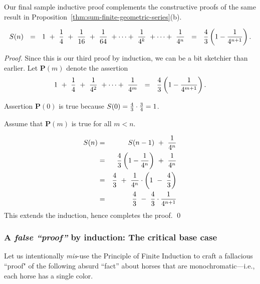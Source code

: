 Our final sample inductive proof complements the constructive proofs of the same result in 
Proposition~\ref{thm:sum-finite-geometric-series}(b).

\begin{prop}
\label{thm:sumof-1/4-induction}
\[
S(n) \ \ = \ \
1 \ + \ {1 \over 4} \ + \ {1 \over 16} \ + \ {1 \over 64} \ + \cdots + \ {1 \over 4^k } \ + \cdots + \ {1 \over 4^n }
\ \ = \ \  {4 \over 3} \left(1 - {1 \over 4^{n+1}} \right).
\]
\end{prop}

\begin{proof}
Since this is our third proof by induction, we can be a bit sketchier than earlier.  Let {\bf P}$(m)$ 
denote the assertion
\[ 1 \ + \ {1 \over 4} \ + \ {1 \over 4^2} \ + \cdots + \ {1 \over 4^m}
\ \ = \ \  {4 \over 3} \left(1 - {1 \over 4^{m+1}} \right).
\]

Assertion {\bf P}$(0)$ is true because $S(0) = {4 \over 3} \cdot {3 \over 4} = 1$.

\smallskip

Assume that {\bf P}$(m)$ is true for all $m < n$.

\smallskip

\begin{eqnarray*}
S(n) & = & S(n-1) \ + \ {1 \over 4^n} \\
        & = & {4 \over 3} \left(1 - {1 \over 4^{n}} \right) \ + \ {1 \over 4^{n}} \\
        & = & {4 \over 3} \ + \ {1 \over 4^n} \cdot \left( 1  \ - \  {4 \over 3} \right) \\
        & = & {4 \over 3} \ - \ {4 \over 3} \cdot {1 \over 4^{n+1}}
\end{eqnarray*}
This extends the induction, hence completes the proof.
\qed
\end{proof}


\subsubsection{A {\em false ``proof''} by induction: The critical base case}
\label{sec:false-induction}

Let us intentionally {\em mis}-use the Principle of Finite Induction to craft a fallacious ``proof" of the following absurd ``fact'' about horses that are monochromatic---i.e., each horse has a single color.

\medskip

